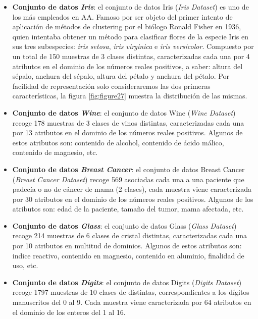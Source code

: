 \begin{itemize}
	
	\item \textbf{Conjunto de datos \textit{Iris}}: el conjunto de datos Iris (\textit{Iris Dataset}) es uno de los más empleados en \acs{AA}. Famoso por ser objeto del primer intento de aplicación de métodos de clustering por el biólogo Ronald Fisher en 1936, quien intentaba obtener un método para clasificar flores de la especie Iris en sus tres subespecies: \textit{iris setosa}, \textit{iris virginica} e \textit{iris versicolor}. Compuesto por un total de 150 muestras de 3 clases distintas, caracterizadas cada una por 4 atributos en el dominio de los números reales positivos, a saber: altura del sépalo, anchura del sépalo, altura del pétalo y anchura del pétalo. Por facilidad de representación solo consideraremos las dos primeras características, la figura \ref{fig:figure27} muestra la distribución de las mismas.
	
	\item \textbf{Conjunto de datos \textit{Wine}}: el conjunto de datos Wine (\textit{Wine Dataset}) recoge 178 muestras de 3 clases de vinos distintas, caracterizadas cada una por 13 atributos en el dominio de los números reales positivos. Algunos de estos atributos son: contenido de alcohol, contenido de ácido málico, contenido de magnesio, etc.
	
	\item \textbf{Conjunto de datos \textit{Breast Cancer}}: el conjunto de datos Breast Cancer (\textit{Breast Cancer Dataset}) recoge 569 asociadas cada una a una paciente que padecía o no de cáncer de mama (2 clases), cada muestra viene caracterizada por 30 atributos en el dominio de los números reales positivos. Algunos de los atributos son: edad de la paciente, tamaño del tumor, mama afectada, etc.
	
	\item \textbf{Conjunto de datos \textit{Glass}}: el conjunto de datos Glass (\textit{Glass Dataset}) recoge 214 muestras de 6 clases de cristal distintas, caracterizadas cada una por 10 atributos en multitud de dominios. Algunos de estos atributos son: indice reactivo, contenido en magnesio, contenido en aluminio, finalidad de uso, etc.
	
	\item \textbf{Conjunto de datos \textit{Digits}}: el conjunto de datos Digits (\textit{Digits Dataset}) recoge 1797 muestras de 10 clases de distintas, correspondientes a los dígitos manuscritos del 0 al 9. Cada muestra viene caracterizada por 64 atributos en el dominio de los enteros del 1 al 16.
	
\end{itemize}

